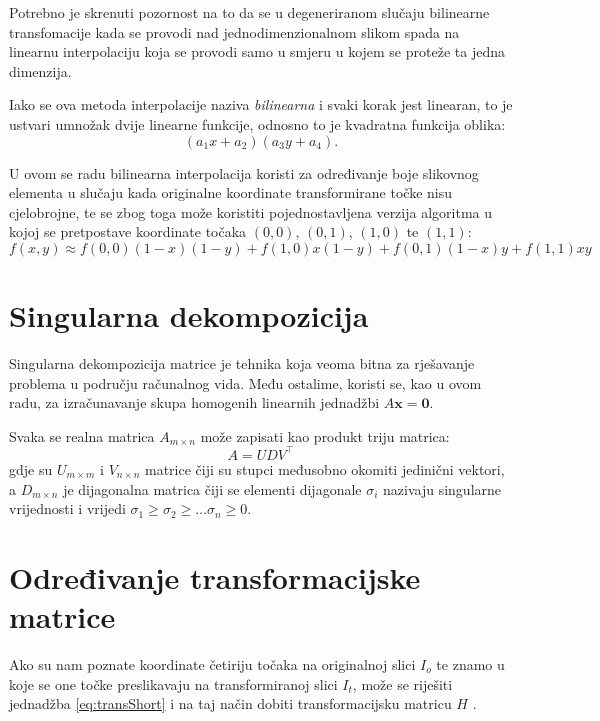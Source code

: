 Potrebno je skrenuti pozornost na to da se u degeneriranom slučaju bilinearne transfomacije kada se provodi nad jednodimenzionalnom slikom spada na linearnu interpolaciju koja se provodi samo u smjeru u kojem se proteže ta jedna dimenzija.

Iako se ova metoda interpolacije naziva \emph{bilinearna} i svaki korak jest linearan, to je ustvari umnožak dvije linearne funkcije, odnosno to je kvadratna funkcija oblika:
\begin{equation}
	(a_1x + a_2)(a_3y + a_4) \text{.}
\end{equation}

U ovom se radu bilinearna interpolacija koristi za određivanje boje slikovnog elementa  u slučaju kada originalne koordinate transformirane točke nisu cjelobrojne, te se zbog toga može koristiti pojednostavljena verzija algoritma u kojoj se pretpostave koordinate točaka $(0,0)$, $(0, 1)$, $(1, 0)$ te $(1, 1)$:
\begin{equation}
\label{eq:interpolationSImple}
f(x, y) \approx f(0, 0)(1 - x)(1 -  y) + f(1, 0) x (1 - y) + f(0, 1) (1 - x) y + f(1, 1) x y
\end{equation}

\section{Singularna dekompozicija}
\label{sec:svd}

Singularna dekompozicija matrice je tehnika koja veoma bitna za rješavanje problema u području računalnog vida. Među ostalime, koristi se, kao u ovom radu, za izračunavanje skupa homogenih linearnih jednadžbi $A\mathbf{x}=\mathbf{0}$.

Svaka se realna matrica $A_{m \times n}$ može zapisati kao produkt triju matrica:
\begin{equation}
	A = U D V^\top
\end{equation}
gdje su $U_{m \times m}$ i $V_{n \times n}$ matrice čiji su stupci međusobno okomiti jedinični vektori, a $D_{m \times n}$ je dijagonalna matrica čiji se elementi dijagonale $\sigma_i$ nazivaju singularne vrijednosti i vrijedi $\sigma_1 \geq \sigma_2 \geq \ldots \sigma_n \geq 0$.

\section{Određivanje transformacijske matrice}
\label{sec:odredjivanjeTransMat}

Ako su nam poznate koordinate četiriju točaka na originalnoj slici $I_o$ te znamo u koje se one točke preslikavaju na transformiranoj slici $I_t$, može se riješiti jednadžba \eqref{eq:transShort} i na taj način dobiti transformacijsku matricu $H$ \citep{segvicDinAn3D}.

